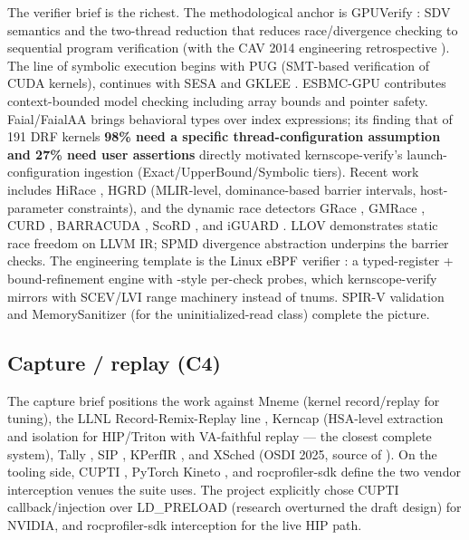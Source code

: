\documentclass[10pt]{article}
\newcommand{\kst}[1]{\texttt{\detokenize{#1}}}
\begin{document}
The verifier brief is the richest. The methodological anchor is GPUVerify
\citep{gpuverify2012, gpuverify2015}: SDV semantics and the two-thread reduction that
reduces race/divergence checking to sequential program verification (with the CAV 2014
engineering retrospective \citep{gpuverify2014cav}). The line of symbolic execution begins
with PUG \citep{pug2010} (SMT-based verification of CUDA kernels), continues with SESA
\citep{sesa2014} and GKLEE \citep{gklee2012}. ESBMC-GPU \citep{esbmcgpu2017} contributes
context-bounded model checking including array bounds and pointer safety. Faial/FaialAA
\citep{faial2024} brings behavioral types over index expressions; its finding that of 191
DRF kernels \textbf{98\% need a specific thread-configuration assumption and 27\% need user
assertions} directly motivated kernscope-verify's launch-configuration ingestion
(Exact/UpperBound/Symbolic tiers). Recent work includes HiRace \citep{hirace2024}, HGRD
\citep{hgrd2026} (MLIR-level, dominance-based barrier intervals, host-parameter
constraints), and the dynamic race detectors GRace \citep{grace2011}, GMRace
\citep{gmrace2014}, CURD \citep{curd2018}, BARRACUDA \citep{barracuda2017}, ScoRD
\citep{scord2020}, and iGUARD \citep{iguard2021}. LLOV \citep{llov2020} demonstrates
static race freedom on LLVM IR; SPMD divergence abstraction \citep{spmddivergence2021}
underpins the barrier checks. The engineering template is the Linux eBPF verifier
\citep{ebpfVerifier}: a typed-register + bound-refinement engine with
\kst{check\_map\_access()}-style per-check probes, which kernscope-verify mirrors with
SCEV/LVI range machinery instead of tnums. SPIR-V validation \citep{spirvSpec} and
MemorySanitizer \citep{msan2015} (for the uninitialized-read class) complete the picture.

\subsection{Capture / replay (C4)}

The capture brief positions the work against Mneme \citep{mneme2023} (kernel record/replay
for tuning), the LLNL Record-Remix-Replay line \citep{r3-2026}, Kerncap
\citep{kerncap2026} (HSA-level extraction and isolation for HIP/Triton with
VA-faithful replay --- the closest complete system), Tally \citep{tally2024},
SIP \citep{sip2024}, KPerfIR \citep{kperfir2025}, and XSched (OSDI 2025, source of
\kst{cuda-intercept}). On the tooling side, CUPTI \citep{cupti}, PyTorch Kineto
\citep{kineto}, and rocprofiler-sdk \citep{rocprofilerSDK} define the two vendor
interception venues the suite uses. The project explicitly chose CUPTI
callback/injection over LD\_PRELOAD (research overturned the draft design) for NVIDIA,
and rocprofiler-sdk interception for the live HIP path.
\end{document}
